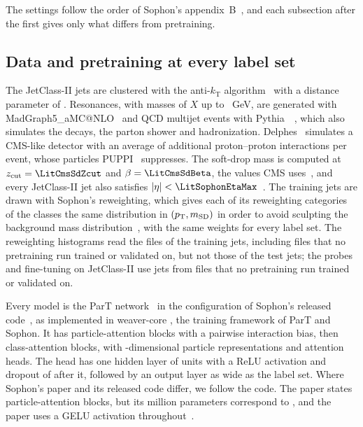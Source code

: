 The settings follow the order of Sophon's appendix~B~\cite{sophon}, and each subsection after the first gives
only what differs from pretraining.

\subsection{Data and pretraining at every label set}\label{sec:app-pretrain}

The JetClass-II jets are clustered with the anti-$k_{\mathrm T}$ algorithm~\cite{antikt} with a distance
parameter of \LitJetClassTwoJetRadius. Resonances, with masses of $X$ up to \LitJetClassTwoMaxResonanceMass~GeV,
are generated with MadGraph5\_aMC@NLO~\cite{madgraph} and QCD multijet events with
Pythia~\LitPythiaVersion~\cite{pythia}, which also simulates the decays, the parton shower and hadronization.
Delphes~\cite{delphes} simulates a CMS-like detector with an average of \LitJetClassTwoPileupMean{} additional
proton--proton interactions per event, whose particles PUPPI~\cite{puppi} suppresses. The soft-drop mass is
computed at $z_{\mathrm{cut}} = \LitCmsSdZcut$ and $\beta = \LitCmsSdBeta$, the values CMS uses~\cite{cmsmlid},
and every JetClass-II jet also satisfies $|\eta| < \LitSophonEtaMax$~\cite[App.~A]{sophon}. The training jets
are drawn with Sophon's reweighting, which gives each of its reweighting categories of the \Kfull{} classes the
same distribution in $(p_{\mathrm{T}}, m_{\mathrm{SD}})$ in order to avoid sculpting the background mass
distribution~\cite[Sec.~II]{sophon}, with the same weights for every label set. The reweighting histograms read
the files of the training jets, including files that no pretraining run trained or validated on, but not those of the
test jets; the probes and fine-tuning on JetClass-II use
jets from files that no pretraining run trained or validated on.

Every model is the ParT network~\cite{part} in the configuration of Sophon's released
code~\cite{sophoncode}, as implemented in weaver-core \DesignWeaverVersion{}, the training framework of
ParT and Sophon. It has \DesignParticleBlocks{} particle-attention blocks with a pairwise interaction
bias, then \DesignClassBlocks{} class-attention blocks, with \DesignEmbedDim-dimensional particle
representations and \DesignHeads{} attention heads. The head has one hidden layer of \DesignHeadHidden{}
units with a ReLU activation and dropout of \MlstFtHeadDropout{} after it, followed by an output layer as
wide as the label set.
Where Sophon's paper and its released code differ, we follow the code. The paper states
\LitSophonPaperParticleBlocks{} particle-attention blocks, but its \LitSophonParamsMillion{} million parameters
correspond to \LitSophonBlocksCode, and the paper uses a GELU activation throughout~\cite[App.~B.1]{sophon}.

